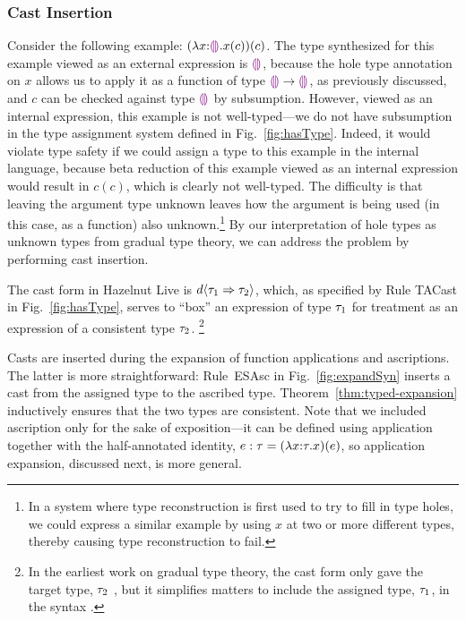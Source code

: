 \subsubsection{Cast Insertion}\label{sec:cast-insertion} 
%
Consider the following example: $(\lambda x{:}\textcolor{violet}{\llparenthesis}\textcolor{violet}{\rrparenthesis}.x(c))(c)$. 
The type synthesized for this example viewed as an external expression is $\textcolor{violet}{\llparenthesis}\textcolor{violet}{\rrparenthesis}$, because the hole type annotation on $x$ allows us to apply it as a function of type $\textcolor{violet}{\llparenthesis}\textcolor{violet}{\rrparenthesis} \rightarrow \textcolor{violet}{\llparenthesis}\textcolor{violet}{\rrparenthesis}$, as previously discussed, and $c$ can be checked against type $\textcolor{violet}{\llparenthesis}\textcolor{violet}{\rrparenthesis}$ by subsumption. 
However, viewed as an internal expression, this example is not well-typed---we do not have subsumption in the type assignment system defined in Fig.~\ref{fig:hasType}. 
Indeed, it would violate type safety if we could assign a type to this example in the internal language, because beta reduction of this example viewed as an internal expression would result in $c(c)$, which is clearly not well-typed.
The difficulty is that leaving the argument type unknown leaves how the argument is being used (in this case, as a function) also unknown.\footnote{In a system where type reconstruction is first used to try to fill in type holes, we could express a similar example by using $x$ at two or more different types, thereby causing type reconstruction to fail.
}
By our  interpretation of hole types as unknown types from gradual type theory, we can address the problem by performing cast insertion. 
%

The cast form in Hazelnut Live is $d \langle{\tau_1}\Rightarrow{\tau_2}\rangle$, which, as specified by Rule TACast in Fig.~\ref{fig:hasType}, serves to ``box'' an expression of type $\tau_1$ for treatment as an expression of a consistent type $\tau_2$.%
\footnote{In the earliest work on gradual type theory, the cast form only gave the target type, $\tau_2$ \cite{Siek06a}, but it simplifies matters to include the assigned type, $\tau_1$, in the syntax \cite{DBLP:conf/snapl/SiekVCB15}.}

Casts are inserted during the expansion of function applications and ascriptions. 
The latter is more straightforward: 
Rule~{ESAsc} in Fig.~\ref{fig:expandSyn} inserts a cast from the assigned type to the ascribed  type. 
Theorem~\ref{thm:typed-expansion} inductively ensures that the two types are consistent.  
Note that we included ascription only for the sake of exposition---it can be defined using application together with the half-annotated identity, $e : \tau = (\lambda x{:}\tau.x)(e)$, so application expansion, discussed next, is more general.

